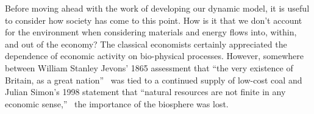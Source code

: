 Before moving ahead with the work of developing our dynamic model,
it is useful to consider how society has come to this point.
How is it that we don't account for the environment when 
considering materials and energy flows into, within, and out of the economy?
The classical economists certainly appreciated the dependence of
economic activity on bio-physical processes.\cite{Cleveland1987, Hall2011, Dale2012}
However, somewhere between William Stanley Jevons' 1865
assessment that
``the very existence of Britain, as a great nation''~\cite[IV.3]{Jevons1865}
was tied to a continued supply of low-cost coal 
and Julian Simon's 1998 statement that
``natural resources are not finite in any economic sense,''~\cite[p.~54]{Simon1998} %
the importance of the biosphere was lost.

%



